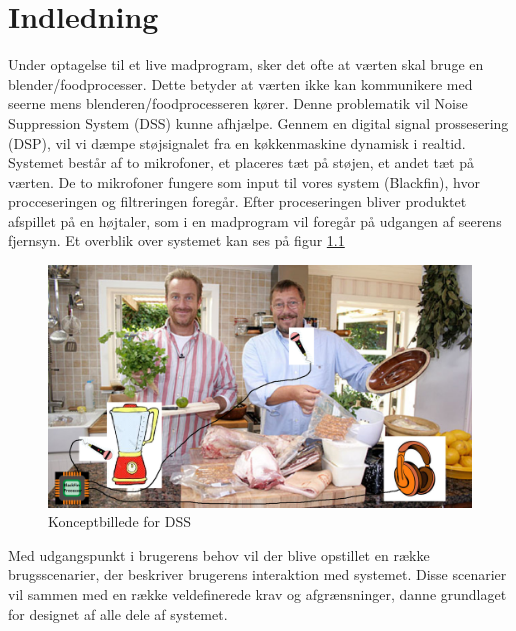 \graphicspath{{Chapters/Indledning/}}

\chapter{Indledning}

Under optagelse til et live madprogram, sker det ofte at værten skal bruge en blender/foodprocesser. Dette betyder at værten ikke kan kommunikere med seerne mens blenderen/foodprocesseren kører. Denne problematik vil Noise Suppression System (DSS) kunne afhjælpe. Gennem en digital signal prossesering (DSP), vil vi dæmpe støjsignalet fra en køkkenmaskine dynamisk i realtid. Systemet består af to mikrofoner, et placeres tæt på støjen, et andet tæt på værten. De to mikrofoner fungere som input til vores system (Blackfin), hvor procceseringen og filtreringen foregår. Efter proceseringen bliver produktet afspillet på en højtaler, som i en madprogram vil foregår på udgangen af seerens fjernsyn. Et overblik over systemet kan ses på figur \ref{fig:konceptbillede}

\begin{figure}[H]
	\centering
	\includegraphics[width = 400pt]{Img/Konceptbillede}
	\caption{Konceptbillede for DSS}
	\label{fig:konceptbillede}
\end{figure}

Med udgangspunkt i brugerens behov vil der blive opstillet en række brugsscenarier, der beskriver brugerens interaktion med systemet. Disse scenarier vil sammen med en række veldefinerede krav og afgrænsninger, danne grundlaget for designet af alle dele af systemet.  \\ 

\newpage

